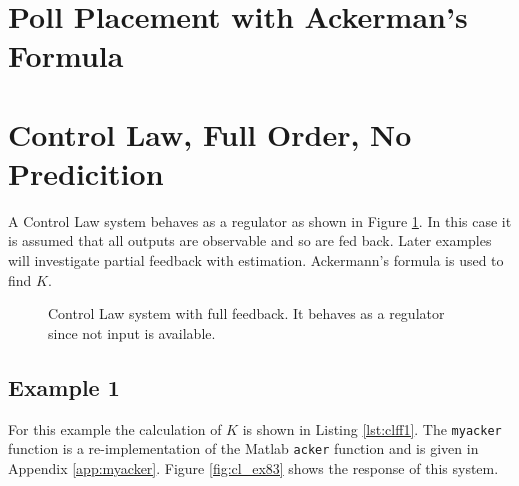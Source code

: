 \documentclass{article}
\begin{document}


\clearpage
\section{Poll Placement with Ackerman's Formula}

\clearpage
\section{Control Law, Full Order, No Predicition}

A Control Law system behaves as a regulator as shown in
Figure \ref{fig:clff1}.
In this case it is assumed that all outputs are observable and
so are fed back.
Later examples will investigate partial feedback with estimation.
Ackermann's formula is used to find $K$.

\begin{figure}[hpb!]
\begin{center}


\end{center}

\caption{Control Law system with full feedback.
It behaves as a regulator since not input is available.}
\label{fig:clff1}
\end{figure}

\subsection{Example 1}

For this example the calculation of $K$ is shown in Listing \ref{lst:clff1}.
The \verb+myacker+ function is a re-implementation of the Matlab \verb+acker+
function and is given in Appendix \ref{app:myacker}.
Figure \ref{fig:cl_ex83} shows the response of this system.
\end{document}
